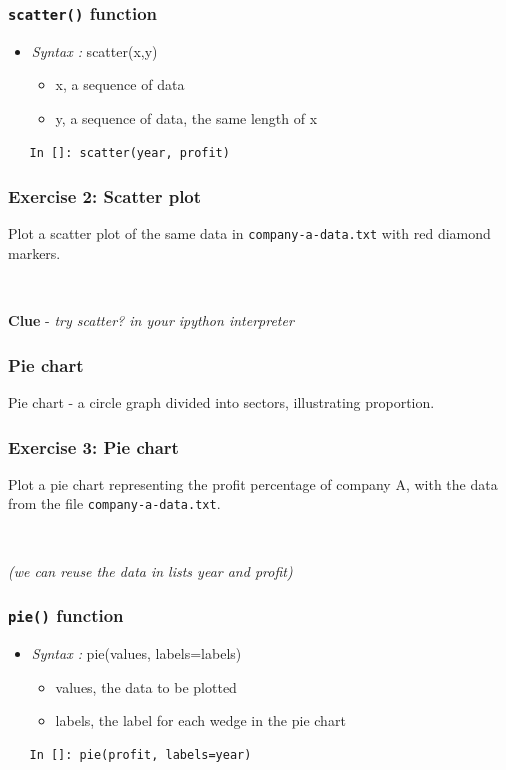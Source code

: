 \documentclass[presentation]{beamer}
\begin{document}
\begin{frame}[fragile]
\frametitle{\verb~scatter()~ function}
\label{sec-5}


\begin{itemize}
\item \emph{Syntax :} scatter(x,y)
\begin{itemize}
\item x, a sequence of data
\item y, a sequence of data, the same length of x
\end{itemize}
\end{itemize}
\begin{verbatim}
   In []: scatter(year, profit)
\end{verbatim}
\end{frame}
\begin{frame}[fragile]
\frametitle{Exercise 2: Scatter plot}
\label{sec-6}

  Plot a scatter plot of the same data in \verb~company-a-data.txt~ with red diamond markers.
\begin{verbatim}
   
\end{verbatim}

  \textbf{Clue} - \emph{try scatter? in your ipython interpreter}
\end{frame}
\begin{frame}
\frametitle{Pie chart}
\label{sec-7}

  Pie chart - a circle graph divided into sectors, illustrating proportion. 
\end{frame}
\begin{frame}[fragile]
\frametitle{Exercise 3: Pie chart}
\label{sec-8}

  Plot a pie chart representing the profit percentage of company A, with the data 
  from the file \verb~company-a-data.txt~.
\begin{verbatim}
   
\end{verbatim}

  \emph{(we can reuse the data in lists year and profit)}
\end{frame}
\begin{frame}[fragile]
\frametitle{\verb~pie()~ function}
\label{sec-9}


\begin{itemize}
\item \emph{Syntax :} pie(values, labels=labels)
\begin{itemize}
\item values, the data to be plotted
\item labels, the label for each wedge in the pie chart
\end{itemize}
\end{itemize}
\begin{verbatim}
   In []: pie(profit, labels=year)
\end{verbatim}
\end{frame}
\end{document}
